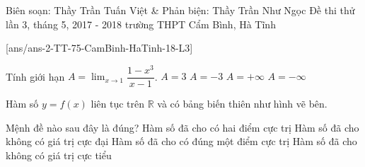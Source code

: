 \begin{name}
{Biên soạn: Thầy Trần Tuấn Việt \& Phản biện: Thầy Trần Như Ngọc}
{Đề thi thử lần 3, tháng 5, 2017 - 2018 trường THPT Cẩm Bình, Hà Tĩnh}
\end{name}
\setcounter{ex}{0}\setcounter{bt}{0}
[ans/ans-2-TT-75-CamBinh-HaTinh-18-L3]

\begin{ex}%
Tính giới hạn $A = \displaystyle  \lim_{x \rightarrow 1} \dfrac{1 - x^3}{x - 1}$.
\choice
{$A = 3$}
{\True $A = -3$}
{$A = + \infty$}
{$A = -\infty$}
\end{ex}


\begin{ex}%
Hàm số $y = f(x)$ liên tục trên $\mathbb{R}$ và có bảng biến thiên như hình vẽ bên.

\begin{center}
\end{center}

Mệnh đề nào sau đây là đúng?\choice
{\True Hàm số đã cho có hai điểm cực trị}
{Hàm số đã cho không có giá trị cực đại}
{Hàm số đã cho có đúng một điểm cực trị}
{Hàm số đã cho không có giá trị cực tiểu}
\end{ex}


